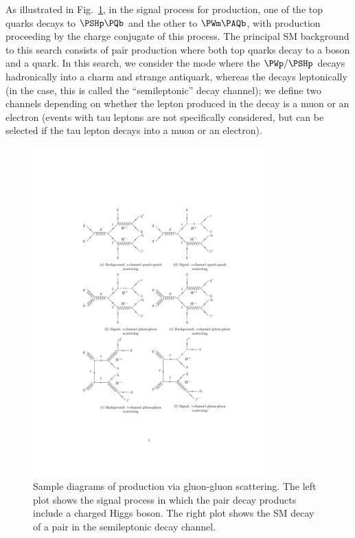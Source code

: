 As illustrated in Fig.~\ref{fig:feyn_diag_sig}, in the signal process
for \PSHp production, one of the top quarks decays to $\PSHp\PQb$ and
the other to $\PWm\PAQb$, with \PSHm production proceeding by the
charge conjugate of this process. The principal SM background to this
search consists of \ttbar pair production where both top quarks decay
to a \PW boson and a \PQb quark. In this search, we consider the mode
where the $\PWp/\PSHp$ decays hadronically into a charm and strange antiquark, 
whereas the \PWm decays leptonically (in the \ttbar case, this is 
called the ``semileptonic'' decay channel); we define two channels 
depending on whether the lepton produced in the \PWm decay is a muon 
or an electron (events with tau leptons are not specifically considered,
but can be selected if the tau lepton decays into a muon or an electron).
\begin{figure}[htp]
\centering
\includegraphics[width=0.8\textwidth]{Figure_001.pdf}
\caption{Sample diagrams of \ttbar production via gluon-gluon
    scattering. The left plot shows the signal process in which the
    \ttbar pair decay products include a charged Higgs boson. The
    right plot shows the SM decay of a \ttbar pair in the
    semileptonic decay channel.}
\label{fig:feyn_diag_sig}
\end{figure}

